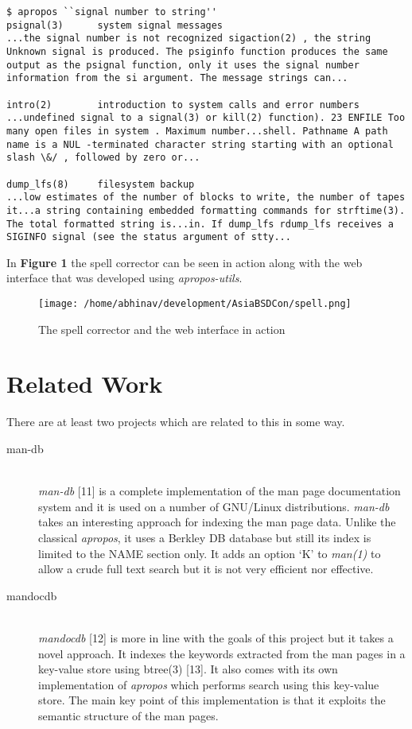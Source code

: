 \documentclass[titlepage, a4paper, 12pt]{article}
\begin{document}
\begin{lstlisting}
$ apropos ``signal number to string''
psignal(3)      system signal messages
...the signal number is not recognized sigaction(2) , the string Unknown signal is produced. The psiginfo function produces the same output as the psignal function, only it uses the signal number information from the si argument. The message strings can...

intro(2)        introduction to system calls and error numbers
...undefined signal to a signal(3) or kill(2) function). 23 ENFILE Too many open files in system . Maximum number...shell. Pathname A path name is a NUL -terminated character string starting with an optional slash \&/ , followed by zero or...

dump_lfs(8)     filesystem backup
...low estimates of the number of blocks to write, the number of tapes it...a string containing embedded formatting commands for strftime(3). The total formatted string is...in. If dump_lfs rdump_lfs receives a SIGINFO signal (see the status argument of stty...
\end{lstlisting}

In \textbf{Figure 1} the spell corrector can be seen in action along with the web
interface that was developed using \textit{apropos-utils}.
\begin{figure}[htp]
\texttt{[image: /home/abhinav/development/AsiaBSDCon/spell.png]}
\caption{The spell corrector and the web interface in action}
\label{}
\end{figure}


\section{Related Work}
There are at least two projects which are related to this in some way.
\begin{description}
\item[man-db] \hfill \\
\textit{man-db} [11] is a complete implementation of the man page documentation
system and it is used on a number of GNU/Linux distributions. \textit{man-db}
takes an interesting approach for indexing the man page data. Unlike the
classical \textit{apropos}, it uses a Berkley DB database but still its index
is limited to the NAME section only. It adds an option `K' to \textit{man(1)} to
allow a crude full text search but it is not very efficient nor effective.
\end{description}
\begin{description}
\item[mandocdb] \hfill \\
\textit{mandocdb} [12] is more in line with the goals of this project but it
takes a novel approach. It indexes the keywords extracted from the man pages in a
key-value store using btree(3) [13]. It also comes with its own implementation
of \textit{apropos} which performs search using this key-value store. The
main key point of this implementation is that it exploits the semantic structure
of the man pages.
\end{description}
\end{document}
